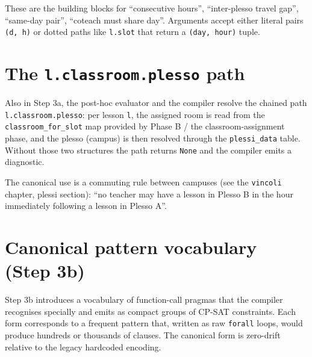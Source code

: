 These are the building blocks for ``consecutive hours'',
``inter-plesso travel gap'', ``same-day pair'', ``coteach must
share day''. Arguments accept either literal pairs
\texttt{(d, h)} or dotted paths like \texttt{l.slot} that
return a \texttt{(day, hour)} tuple.

\section{The \texttt{l.classroom.plesso} path}

Also in Step 3a, the post-hoc evaluator and the compiler
resolve the chained path \texttt{l.classroom.plesso}: per
lesson \texttt{l}, the assigned room is read from the
\texttt{classroom\_for\_slot} map provided by Phase B / the
classroom-assignment phase, and the plesso (campus) is then
resolved through the \texttt{plessi\_data} table. Without
those two structures the path returns \texttt{None} and the
compiler emits a diagnostic.

The canonical use is a commuting rule between campuses (see
the \texttt{vincoli} chapter, plessi section): ``no teacher
may have a lesson in Plesso B in the hour immediately
following a lesson in Plesso A''.

\section{Canonical pattern vocabulary (Step 3b)}
\label{sec:dsl-canonici-en}

Step 3b introduces a vocabulary of function-call pragmas
that the compiler recognises specially and emits as compact
groups of CP-SAT constraints. Each form corresponds to a
frequent pattern that, written as raw \texttt{forall} loops,
would produce hundreds or thousands of clauses. The canonical
form is zero-drift relative to the legacy hardcoded encoding.

